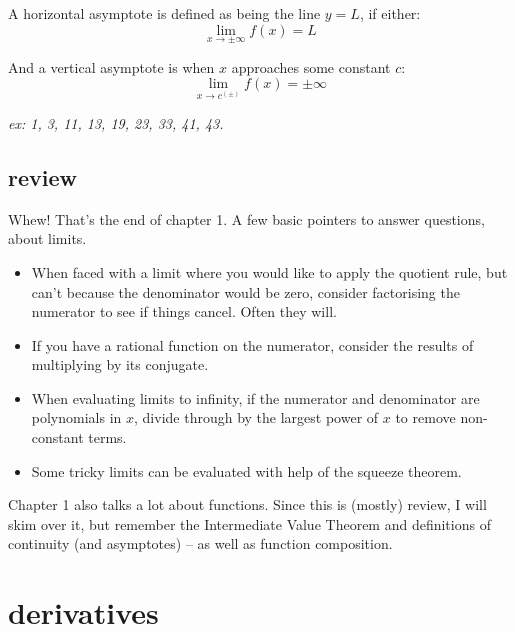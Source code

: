 \documentclass[10pt,a4paper]{report}
\begin{document}
A horizontal asymptote is defined as being the line $y = L$, if either:
$$
	\lim_{x \to \pm \infty} f(x) = L
$$

And a vertical asymptote is when $x$ approaches some constant $c$:
$$
	\lim_{x \to c^{(\pm)}} f(x) = \pm \infty
$$

\emph{ex: 1, 3, 11, 13, 19, 23, 33, 41, 43.}

\section*{review}

Whew! That's the end of chapter 1. A few basic pointers to answer questions, about limits.

\begin{itemize}
	\item When faced with a limit where you would like to apply the quotient rule, but can't because the denominator would be zero, consider factorising the numerator to see if things cancel. Often they will.

	\item If you have a rational function on the numerator, consider the results of multiplying by its conjugate.

	\item When evaluating limits to infinity, if the numerator and denominator are polynomials in $x$, divide through by the largest power of $x$ to remove non-constant terms.

	\item Some tricky limits can be evaluated with help of the squeeze theorem.
\end{itemize}

Chapter 1 also talks a lot about functions. Since this is (mostly) review, I will skim over it, but remember the Intermediate Value Theorem and definitions of continuity (and asymptotes) -- as well as function composition.









\chapter{derivatives}
\end{document}
